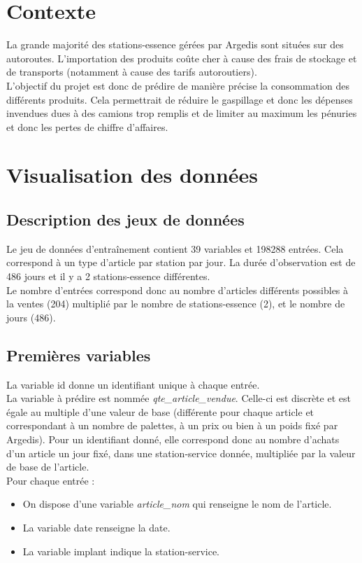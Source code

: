\documentclass{article} %
\begin{document}
\section{Contexte}
La grande majorité des stations-essence gérées par Argedis sont situées sur des autoroutes. L’importation des produits coûte cher à cause des frais de stockage et de transports (notamment à cause des tarifs autoroutiers). \\

L’objectif du projet est donc de prédire de manière précise la consommation des différents produits. Cela permettrait de réduire le gaspillage et donc les dépenses invendues dues à des camions trop remplis et de limiter au maximum les pénuries et donc les pertes de chiffre d’affaires.
\newpage
\section{Visualisation des données}
\subsection{Description des jeux de données}
Le jeu de données d’entraînement contient 39 variables et 198288 entrées. Cela correspond à un type d’article par station par jour. La durée d’observation est de 486 jours et il y a 2 stations-essence différentes. \\

Le nombre d’entrées correspond donc au nombre d’articles différents possibles à la ventes (204) multiplié par le nombre de stations-essence (2), et le nombre de jours (486).

\subsection{Premières variables}
La variable id donne un identifiant unique à chaque entrée.\\
La variable à prédire est nommée \textit{qte\_article\_vendue}. Celle-ci est discrète et est égale au multiple d’une valeur de base (différente pour chaque article et correspondant à un nombre de palettes, à un prix ou bien à un poids fixé par Argedis). Pour un identifiant donné, elle correspond donc au nombre d’achats d’un article un jour fixé, dans une station-service donnée, multipliée par la valeur de base de l’article.\\
Pour chaque entrée :
\begin{itemize}
	\item On dispose d’une variable \textit{article\_nom} qui renseigne le nom de l’article.
	\item La variable date renseigne la date.
	\item La variable implant indique la station-service.
\end{itemize}
\end{document}
